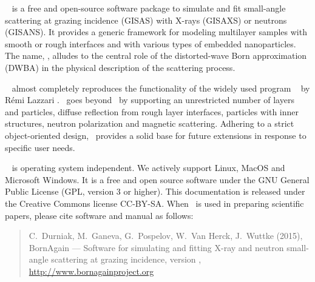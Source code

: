 

\cleardoublepage
{}

\BornAgain\
is a free and open-source software package
to simulate and fit small-angle
scattering at grazing incidence (GISAS)
with X-rays (GISAXS) or neutrons (GISANS).
It provides a generic framework
for modeling multilayer samples with smooth or
rough interfaces and with various types of embedded nanoparticles.
The name, \BornAgain,
alludes to the central role of the distorted-wave Born
approximation (DWBA) in the physical description of the
scattering process.

\BornAgain\
almost completely reproduces the functionality
of the widely used program \IsGISAXS\
\index{Lazzari, R\'emi}
by R\'emi Lazzari \cite{Laz02,Laz08}.
\BornAgain\ goes beyond \IsGISAXS\ by
supporting an unrestricted number of layers and particles, 
diffuse reflection from rough layer interfaces,
particles with inner structures, neutron polarization and magnetic scattering.
Adhering to a strict object-oriented design,
\BornAgain\ provides a solid base for future extensions
in response to specific user needs.

\BornAgain\
%
%
is operating system independent.
We actively support
Linux,
\index{Linux}%
MacOS
%
and  Microsoft Windows.
%
%
It is a free and open source software under
the GNU General Public License (GPL, version 3 or higher).
This documentation is released under the Creative Commons license CC-BY-SA.
When \BornAgain\ is used in preparing scientific papers,
please cite software and manual as follows:
\index{Citation}%
\begin{quote}
C.~Durniak, M.~Ganeva, G.~Pospelov, W.~Van Herck, J.~Wuttke (2015),\newline
BornAgain --- Software for simulating and fitting
X-ray and neutron small-angle scattering at grazing incidence,
version \UserManualVersionNumber,\newline
\url{http://www.bornagainproject.org}
\end{quote}

